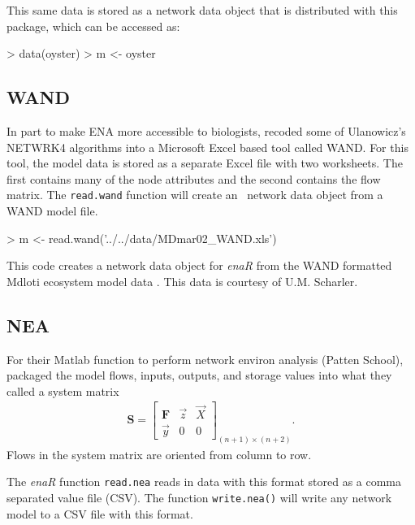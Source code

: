 \documentclass[article]{jss}
\newcommand{\R}{\proglang{R}}
\begin{document}
This same data is stored as a network data object that is distributed
with this package, which can be accessed as:
\begin{Schunk}
\begin{Sinput}
> data(oyster)
> m <- oyster
\end{Sinput}
\end{Schunk}

\subsection*{WAND}
In part to make ENA more accessible to biologists,
\citet{allesina04_wand} recoded some of Ulanowicz's NETWRK4 algorithms
into a Microsoft Excel based tool called WAND.  For this tool, the
model data is stored as a separate Excel file with two worksheets.
The first contains many of the node attributes and the second contains
the flow matrix.  The \texttt{read.wand} function will create an
\R\ network data object from a WAND model file. 

\begin{Schunk}
\begin{Sinput}
> m <- read.wand('../../data/MDmar02_WAND.xls')
\end{Sinput}
\end{Schunk}

This code creates a network data object for \textit{enaR} from the WAND
formatted Mdloti ecosystem model data
\citep{scharler2012ecosystem}. This data is courtesy of U.M. Scharler.

\subsection*{NEA}

For their Matlab function to perform network environ analysis (Patten School),
\citet{fath06} packaged the model flows, inputs, outputs, and storage
values into what they called a system matrix
\begin{align}
\mathbf{S} = \left[ \begin{array}{ccc} \mathbf{F} & \vec{z} & \vec{X} \\
     \vec{y}  &  0 & 0 \end{array}
\right]_{(n+1) \times (n+2)}.
\end{align}
Flows in the system matrix are oriented from column to row.

The \textit{enaR} function \texttt{read.nea} reads in data with this
format stored as a comma separated value file (CSV).  The function
\texttt{write.nea()} will write any network model to a CSV file with
this format.
\end{document}
